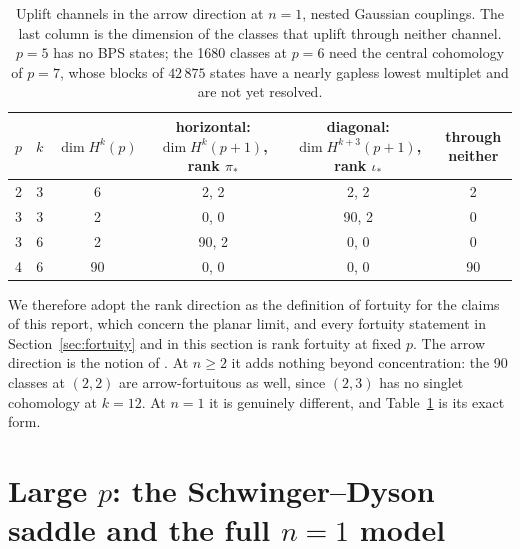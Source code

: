 \documentclass[10pt]{article}
\begin{document}
\begin{table}[t]\centering\small
\begin{tabular}{cccccc}
\toprule
$p$ & $k$ & $\dim H^k(p)$ & horizontal: $\dim H^k(p{+}1)$, rank $\pi_*$ & diagonal: $\dim H^{k+3}(p{+}1)$, rank $\iota_*$ & through neither\\
\midrule
2 & 3 & 6 & 2, 2 & 2, 2 & 2\\
3 & 3 & 2 & 0, 0 & 90, 2 & 0\\
3 & 6 & 2 & 90, 2 & 0, 0 & 0\\
4 & 6 & 90 & 0, 0 & 0, 0 & 90\\
\bottomrule
\end{tabular}
\caption{Uplift channels in the arrow direction at $n=1$, nested Gaussian couplings. The last column is the dimension
of the classes that uplift through neither channel. $p=5$ has no BPS states; the 1680 classes at $p=6$ need the
central cohomology of $p=7$, whose blocks of $42\,875$ states have a nearly gapless lowest multiplet and are not yet
resolved.}
\label{tab:arrow}
\end{table}

We therefore adopt the rank direction as the definition of fortuity for the claims of this report, which concern the
planar limit, and every fortuity statement in Section~\ref{sec:fortuity} and in this section is rank fortuity at
fixed $p$. The arrow direction is the notion of \cite{CV}. At $n\ge2$ it adds nothing beyond concentration: the 90
classes at $(2,2)$ are arrow-fortuitous as well, since $(2,3)$ has no singlet cohomology at $k=12$. At $n=1$ it is
genuinely different, and Table~\ref{tab:arrow} is its exact form.


\section{\texorpdfstring{Large $p$: the Schwinger--Dyson saddle and the full $n=1$ model}{Large p: the Schwinger-Dyson saddle and the full n=1 model}}\label{sec:largep}
\end{document}
